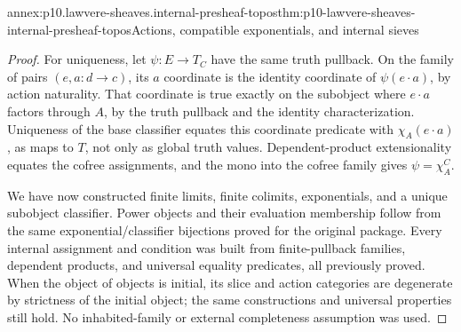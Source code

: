 \begin{annexitem}{annex:p10.lawvere-sheaves.internal-presheaf-topos}{thm:p10-lawvere-sheaves-internal-presheaf-topos}{Actions, compatible exponentials, and internal sieves}
\begin{proof}
For uniqueness, let \(\psi:E\to T_C\) have the same
truth pullback.  On the family of pairs \((e,a:d\to c)\),
its \(a\) coordinate is the identity coordinate of
\(\psi(e\cdot a)\), by action naturality.  That coordinate
is true exactly on the subobject where \(e\cdot a\)
factors through \(A\), by the truth pullback and the
identity characterization.  Uniqueness of the base
classifier equates this coordinate predicate with
\(\chi_A(e\cdot a)\), as maps to \(T\), not only as
global truth values.  Dependent-product extensionality
equates the cofree assignments, and the mono into the
cofree family gives \(\psi=\chi_A^C\).

We have now constructed finite limits, finite colimits,
exponentials, and a unique subobject classifier.  Power
objects and their evaluation membership follow from the
same exponential/classifier bijections proved for the
original package.  Every internal assignment and condition
was built from finite-pullback families, dependent products,
and universal equality predicates, all previously proved.
When the object of objects is initial, its slice and action
categories are degenerate by strictness of the initial
object; the same constructions and universal properties
still hold.  No inhabited-family or external completeness
assumption was used.
\end{proof}
\end{annexitem}

